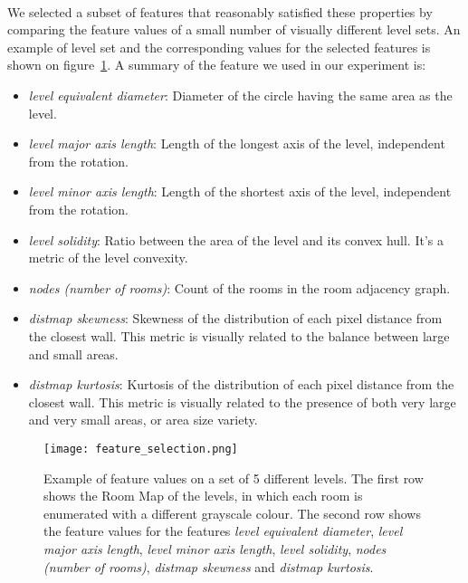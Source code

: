 \paragraph{} We selected a subset of features that reasonably satisfied these properties by comparing the feature values of a small number of visually different level sets. An example of level set and the corresponding values for the selected features is shown on figure~\ref{fig:feature_selection}. A summary of the feature we used in our experiment is:
\begin{itemize}
	\item \textit{level equivalent diameter}: Diameter of the circle having the same area as the level.
	\item \textit{level major axis length}: Length of the longest axis of the level, independent from the rotation.
	\item \textit{level minor axis length}: Length of the shortest axis of the level, independent from the rotation.
	\item \textit{level solidity}: Ratio between the area of the level and its convex hull. It's a metric of the level convexity.
	\item \textit{nodes (number of rooms)}: Count of the rooms in the room adjacency graph.
	\item \textit{distmap skewness}: Skewness of the distribution of each pixel distance from the closest wall. This metric is visually related to the balance between large and small areas.
	\item \textit{distmap kurtosis}: Kurtosis of the distribution of each pixel distance from the closest wall. This metric is visually related to the presence of both very large and very small areas, or area size variety.
\end{itemize}


 \begin{figure}[h!]
 	\texttt{[image: feature\_selection.png]}
 	\caption[Example of feature values]{Example of feature values on a set of 5 different levels. The first row shows the Room Map of the levels, in which each room is enumerated with a different grayscale colour. The second row shows the feature values for the features \textit{level equivalent diameter}, \textit{level major axis length}, \textit{level minor axis length}, \textit{level solidity}, \textit{nodes (number of rooms)}, \textit{distmap skewness} and \textit{distmap kurtosis}. }
 	\label{fig:feature_selection}
 \end{figure}


